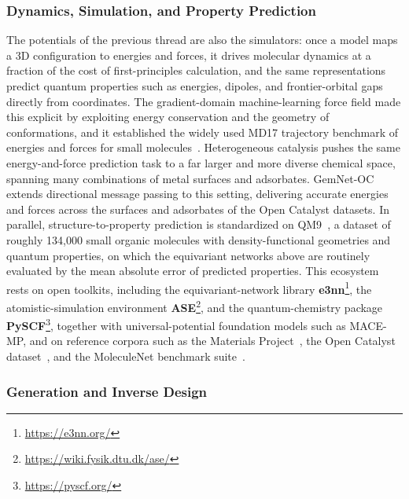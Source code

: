 \subsubsection{Dynamics, Simulation, and Property Prediction}

The potentials of the previous thread are also the simulators: once a model maps a 3D configuration to energies and forces, it drives molecular dynamics at a fraction of the cost of first-principles calculation, and the same representations predict quantum properties such as energies, dipoles, and frontier-orbital gaps directly from coordinates.
The gradient-domain machine-learning force field made this explicit by exploiting energy conservation and the geometry of conformations, and it established the widely used MD17 trajectory benchmark of energies and forces for small molecules~\cite{chmiela2017machine}.
Heterogeneous catalysis pushes the same energy-and-force prediction task to a far larger and more diverse chemical space, spanning many combinations of metal surfaces and adsorbates. 
GemNet-OC~\cite{gasteiger2022gemnet} extends directional message passing to this setting, delivering accurate energies and forces across the surfaces and adsorbates of the Open Catalyst datasets.
In parallel, structure-to-property prediction is standardized on QM9~\cite{ramakrishnan2014quantum}, a dataset of roughly 134{,}000 small organic molecules with density-functional geometries and quantum properties, on which the equivariant networks above are routinely evaluated by the mean absolute error of predicted properties.
This ecosystem rests on open toolkits, including the equivariant-network library \textbf{e3nn}\footnote{\url{https://e3nn.org/}}, the atomistic-simulation environment \textbf{ASE}\footnote{\url{https://wiki.fysik.dtu.dk/ase/}}, and the quantum-chemistry package \textbf{PySCF}\footnote{\url{https://pyscf.org/}}, together with universal-potential foundation models such as MACE-MP, and on reference corpora such as the Materials Project~\cite{jain2013commentary}, the Open Catalyst dataset~\cite{chanussot2021open}, and the MoleculeNet benchmark suite~\cite{wu2018moleculenet}.

\subsubsection{Generation and Inverse Design}

